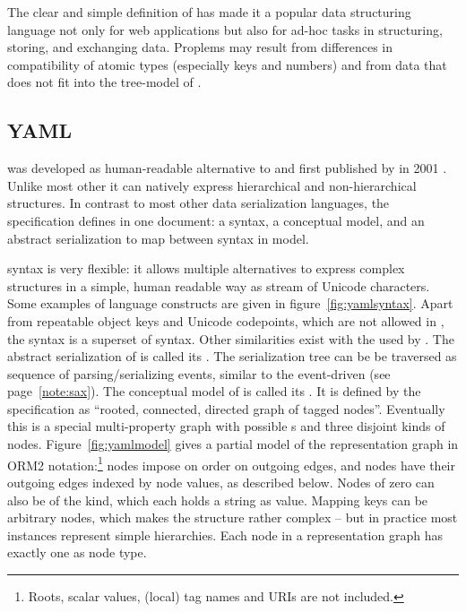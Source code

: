 The clear and simple definition of  has made it a popular data 
structuring language not only for web applications but also for ad-hoc
tasks in structuring, storing, and exchanging data. Proplems may result
from differences in compatibility of atomic types (especially keys and numbers)
and from data that does not fit into the tree-model of .

\subsection{YAML}
\label{sec:yaml}

 was developed as human-readable 
alternative to  and first published by  
in 2001 \cite{YAML2009}. Unlike most other  it can natively 
express hierarchical and non-hierarchical structures. In contrast to most
other data serialization languages, the  specification defines
in one document: a syntax, a conceptual model, and an abstract serialization
to map between syntax in model.

 syntax is very flexible: it allows multiple alternatives to
express complex structures in a simple, human readable way as stream of
Unicode characters. Some examples of language constructs are given in
figure~\ref{fig:yamlsyntax}. Apart from repeatable object keys and Unicode 
 codepoints, which are not allowed in , the 
syntax is a superset of  syntax. Other similarities exist with
the  used by 
\textcite{Abiteboul2000}. The abstract serialization of  is 
called its . The
serialization tree can be be traversed as sequence of parsing/serializing 
events, similar to the event-driven 
(see page~\ref{note:sax}). The conceptual model of  is called
its .
%
It is defined by the specification as ``rooted, connected, directed graph
of tagged nodes''. Eventually this is a special multi-property graph with 
possible s and three disjoint kinds of nodes. Figure~\ref{fig:yamlmodel}
gives a partial model of the representation graph in ORM2 notation:\footnote{Roots,
scalar values, (local) tag names and URIs are not included.}
nodes impose on order on outgoing edges, and  nodes have
their outgoing edges indexed by node values, as described below. Nodes
of  zero can also be of the  kind, which
each holds a  string as value. Mapping keys can be arbitrary 
nodes, which makes the structure rather complex
-- but in practice most  instances represent simple hierarchies. 
Each node in a  representation graph has exactly one 
as node type.

